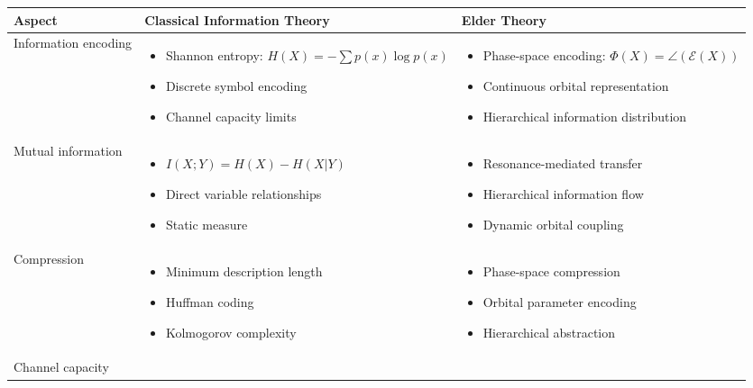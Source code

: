 \begin{table}[h]
\centering
\begin{tabular}{|p{3cm}|p{5cm}|p{5cm}|}
\hline
\textbf{Aspect} & \textbf{Classical Information Theory} & \textbf{Elder Theory} \\
\hline
Information encoding & 
\begin{itemize}
    \item Shannon entropy: $H(X) = -\sum p(x)\log p(x)$
    \item Discrete symbol encoding
    \item Channel capacity limits
\end{itemize} &
\begin{itemize}
    \item Phase-space encoding: $\Phi(X) = \angle(\mathcal{E}(X))$
    \item Continuous orbital representation
    \item Hierarchical information distribution
\end{itemize} \\
\hline
Mutual information & 
\begin{itemize}
    \item $I(X;Y) = H(X) - H(X|Y)$
    \item Direct variable relationships
    \item Static measure
\end{itemize} &
\begin{itemize}
    \item Resonance-mediated transfer
    \item Hierarchical information flow
    \item Dynamic orbital coupling
\end{itemize} \\
\hline
Compression & 
\begin{itemize}
    \item Minimum description length
    \item Huffman coding
    \item Kolmogorov complexity
\end{itemize} &
\begin{itemize}
    \item Phase-space compression
    \item Orbital parameter encoding
    \item Hierarchical abstraction
\end{itemize} \\
\hline
Channel capacity & 
\begin{itemize}

\end{itemize}
\end{tabular}
\end{table}
